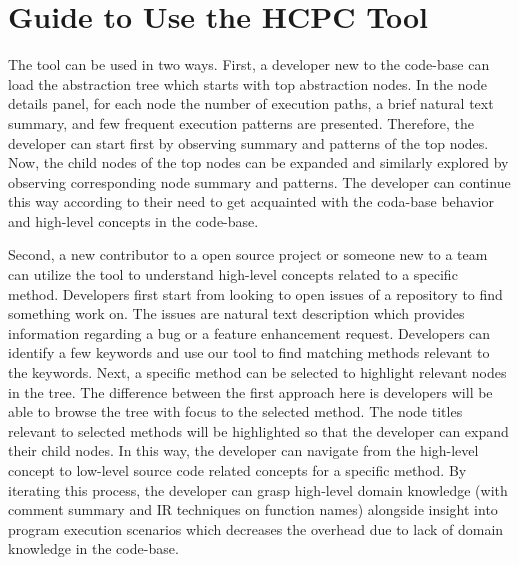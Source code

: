 \section{Guide to Use the HCPC Tool}
\label{hla3:use_guide}
The tool can be used in two ways. First, a developer new to the code-base can load the abstraction tree which starts with top abstraction  nodes. In the node details panel, for each node the number of execution paths, a brief natural text summary, and few frequent execution patterns are presented. Therefore, the developer can start first by observing summary and patterns of the top nodes. Now, the child nodes of the top nodes can be expanded and similarly explored by observing corresponding node summary and patterns. The developer can continue this way according to their need to get acquainted with the coda-base behavior and high-level concepts in the code-base.

Second, a new contributor to a open source project or someone new to a team can utilize the tool to understand high-level concepts related to a specific method. Developers first start from looking to open issues of a repository to find something work on. The issues are natural text description which provides information regarding a bug or a feature enhancement request. Developers can identify a few keywords and use our tool to find matching methods relevant to the keywords. Next, a specific method can be selected to highlight relevant nodes in the tree. The difference between the first approach here is developers will be able to browse the tree with focus to the selected method. The node titles relevant to selected methods will be highlighted so that the developer can expand their child nodes. In this way, the developer can navigate from the high-level concept to low-level source code related concepts for a specific method. By iterating this process, the developer can grasp high-level domain knowledge (with comment summary and IR techniques on function names) alongside insight into program execution scenarios which decreases the overhead due to lack of domain knowledge in the code-base. 


